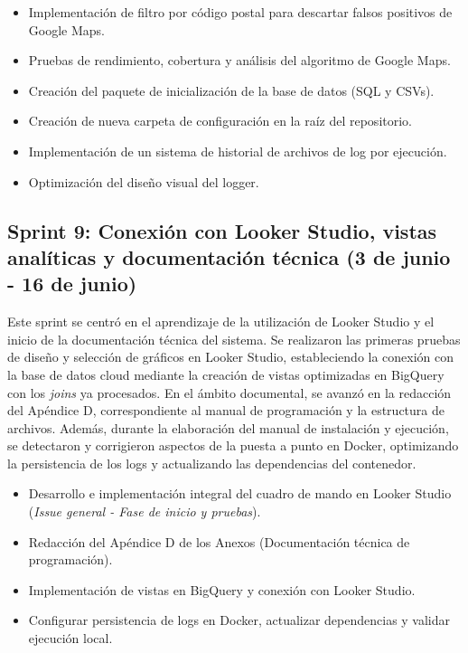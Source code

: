\begin{itemize}
    \item Implementación de filtro por código postal para descartar falsos positivos de Google Maps.
    \item Pruebas de rendimiento, cobertura y análisis del algoritmo de Google Maps.
    \item Creación del paquete de inicialización de la base de datos (SQL y CSVs).
    \item Creación de nueva carpeta de configuración en la raíz del repositorio.
    \item Implementación de un sistema de historial de archivos de log por ejecución.
    \item Optimización del diseño visual del logger.
\end{itemize}

\subsection{Sprint 9: Conexión con Looker Studio, vistas analíticas y documentación técnica (3 de junio - 16 de junio)}
Este sprint se centró en el aprendizaje de la utilización de Looker Studio y el inicio de la documentación técnica del sistema. Se realizaron las primeras pruebas de diseño y selección de gráficos en Looker Studio, estableciendo la conexión con la base de datos cloud mediante la creación de vistas optimizadas en BigQuery con los \textit{joins} ya procesados. En el ámbito documental, se avanzó en la redacción del Apéndice D, correspondiente al manual de programación y la estructura de archivos. Además, durante la elaboración del manual de instalación y ejecución, se detectaron y corrigieron aspectos de la puesta a punto en Docker, optimizando la persistencia de los logs y actualizando las dependencias del contenedor.

\begin{itemize}
    \item Desarrollo e implementación integral del cuadro de mando en Looker Studio (\textit{Issue general - Fase de inicio y pruebas}).
    \item Redacción del Apéndice D de los Anexos (Documentación técnica de programación).
    \item Implementación de vistas en BigQuery y conexión con Looker Studio.
    \item Configurar persistencia de logs en Docker, actualizar dependencias y validar ejecución local.
\end{itemize}

